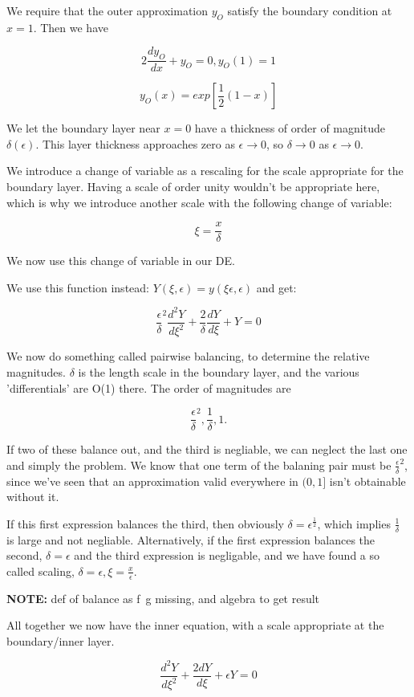 \documentclass[12pt]{report}
\begin{document}
We require that the outer approximation $y_O$ satisfy the boundary condition at
$x=1$. Then we have

$$2 \frac{dy_O}{dx} + y_O = 0, y_O(1)=1$$

$$y_O(x) = exp[\frac 1 2 (1-x)]$$

We let the boundary layer near $x=0$ have a thickness of order of magnitude
$\delta(\epsilon)$. This layer thickness approaches zero as $\epsilon \to 0$, so
$\delta \to 0$ as $\epsilon \to 0$.

We introduce a change of variable as a rescaling for the scale appropriate for
the boundary layer. Having a scale of order unity wouldn't be appropriate here,
which is why we introduce another scale with the following change of variable:

$$\xi = \frac x \delta$$

We now use this change of variable in our DE.

We use this function instead: $Y(\xi, \epsilon) = y(\xi \epsilon, \epsilon)$ and
get:

$$\frac \epsilon \delta^2 \frac{d^2Y}{d\xi^2} + \frac 2 \delta \frac{dY}{d\xi}
+ Y = 0$$

We now do something called pairwise balancing, to determine the relative
magnitudes. $\delta$ is the length scale in the boundary layer, and the various
'differentials' are O(1) there. The order of magnitudes are

$$\frac \epsilon \delta^2, \frac 1 \delta, 1.$$

If two of these balance out, and the third is negliable, we can neglect
the last one and simply the problem. We know that one term of the balaning pair
must be $\frac \epsilon \delta^2$, since we've seen that an approximation valid
everywhere in $(0,1]$ isn't obtainable without it.

If this first expression balances the third, then obviously $\delta =
\epsilon^{\frac 1 2}$, which implies $\frac 1 \delta$ is large and not
negliable. Alternatively, if the first expression balances the second, $\delta =
\epsilon$ and the third expression is negligable, and we have found a so called
scaling, $\delta = \epsilon, \xi=\frac x \epsilon$.

\textbf{NOTE:} def of balance as f~g missing, and algebra to get result

All together we now have the inner equation, with a scale appropriate at the
boundary/inner layer.

$$\frac{d^2Y}{d\xi^2} + \frac{2dY}{d\xi} + \epsilon Y = 0$$
\end{document}
